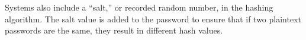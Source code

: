 Systems also include a ``salt,'' or recorded random number, in the hashing algorithm.
The salt value is added to the password to ensure that if two plaintext passwords are the same, they result in different hash values.


